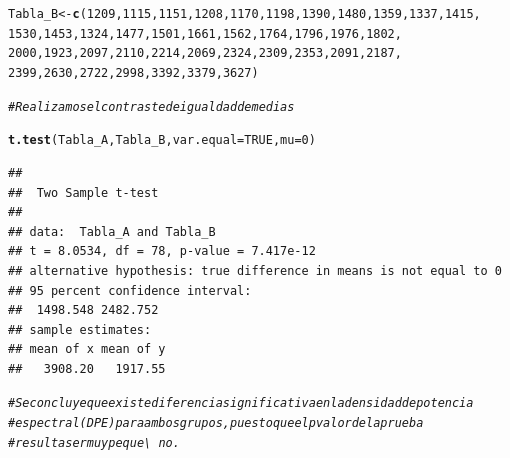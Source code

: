 \documentclass[12pt,letterpaper]{article}\usepackage[]{graphicx}\usepackage[]{color}
\makeatletter
\newcommand{\hlnum}[1]{\textcolor[rgb]{0.686,0.059,0.569}{#1}}%
\newcommand{\hlcom}[1]{\textcolor[rgb]{0.678,0.584,0.686}{\textit{#1}}}%
\newcommand{\hlstd}[1]{\textcolor[rgb]{0.345,0.345,0.345}{#1}}%
\newcommand{\hlkwb}[1]{\textcolor[rgb]{0.69,0.353,0.396}{#1}}%
\newcommand{\hlkwc}[1]{\textcolor[rgb]{0.333,0.667,0.333}{#1}}%
\newcommand{\hlkwd}[1]{\textcolor[rgb]{0.737,0.353,0.396}{\textbf{#1}}}%
\newenvironment{kframe}{%
 \def\at@end@of@kframe{}%
 \ifinner\ifhmode%
  \def\at@end@of@kframe{\end{minipage}}%
  \begin{minipage}{\columnwidth}%
 \fi\fi%
 \def\FrameCommand##1{\hskip\@totalleftmargin \hskip-\fboxsep
 \colorbox{shadecolor}{##1}\hskip-\fboxsep
     \hskip-\linewidth \hskip-\@totalleftmargin \hskip\columnwidth}%
 \MakeFramed {\advance\hsize-\width
   \@totalleftmargin\z@ \linewidth\hsize
   \@setminipage}}%
 {\par\unskip\endMakeFramed%
 \at@end@of@kframe}
\newenvironment{knitrout}{}{} %
\makeatother
\begin{document}
\begin{enumerate}
\begin{knitrout}
\begin{kframe}
\begin{alltt}
\hlstd{Tabla_B}\hlkwb{<-} \hlkwd{c}\hlstd{(}\hlnum{1209}\hlstd{,} \hlnum{1115}\hlstd{,} \hlnum{1151}\hlstd{,} \hlnum{1208}\hlstd{,} \hlnum{1170}\hlstd{,} \hlnum{1198}\hlstd{,} \hlnum{1390}\hlstd{,} \hlnum{1480}\hlstd{,} \hlnum{1359}\hlstd{,} \hlnum{1337}\hlstd{,} \hlnum{1415}\hlstd{,}
            \hlnum{1530}\hlstd{,} \hlnum{1453}\hlstd{,} \hlnum{1324}\hlstd{,} \hlnum{1477}\hlstd{,} \hlnum{1501}\hlstd{,} \hlnum{1661}\hlstd{,} \hlnum{1562}\hlstd{,} \hlnum{1764}\hlstd{,} \hlnum{1796}\hlstd{,} \hlnum{1976}\hlstd{,} \hlnum{1802}\hlstd{,}
            \hlnum{2000}\hlstd{,} \hlnum{1923}\hlstd{,} \hlnum{2097}\hlstd{,} \hlnum{2110}\hlstd{,} \hlnum{2214}\hlstd{,} \hlnum{2069}\hlstd{,} \hlnum{2324}\hlstd{,} \hlnum{2309}\hlstd{,} \hlnum{2353}\hlstd{,} \hlnum{2091}\hlstd{,} \hlnum{2187}\hlstd{,}
            \hlnum{2399}\hlstd{,} \hlnum{2630}\hlstd{,} \hlnum{2722}\hlstd{,} \hlnum{2998}\hlstd{,} \hlnum{3392}\hlstd{,} \hlnum{3379}\hlstd{,} \hlnum{3627}\hlstd{)}

\hlcom{# Realizamos el contraste de igualdad de medias }

\hlkwd{t.test}\hlstd{(Tabla_A, Tabla_B,} \hlkwc{var.equal}\hlstd{=}\hlnum{TRUE}\hlstd{,} \hlkwc{mu}\hlstd{=}\hlnum{0}\hlstd{)}
\end{alltt}
\begin{verbatim}
## 
## 	Two Sample t-test
## 
## data:  Tabla_A and Tabla_B
## t = 8.0534, df = 78, p-value = 7.417e-12
## alternative hypothesis: true difference in means is not equal to 0
## 95 percent confidence interval:
##  1498.548 2482.752
## sample estimates:
## mean of x mean of y 
##   3908.20   1917.55
\end{verbatim}
\begin{alltt}
\hlcom{# Se concluye que existe diferencia significativa en la densidad de potencia }
\hlcom{# espectral (DPE) para ambos grupos, puesto que el p valor de la prueba }
\hlcom{# resulta ser muy peque\textbackslash{}~no.}
\end{alltt}
\end{kframe}
\end{knitrout}
\end{enumerate}
\end{document}
